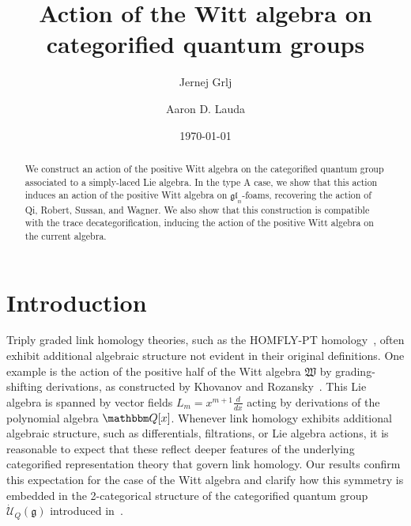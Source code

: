 \documentclass{amsart}
\numberwithin{equation}{section}
\theoremstyle{definition}
\def\Q{{\mathbbm Q}}
\newcommand{\witt}{{\mathfrak{W}}}
\begin{document}
 

\title{Action of the Witt algebra on categorified quantum groups}
 
\author[J. Grlj]{Jernej Grlj}
\address{Department of Mathematics\\
 University of Southern California \\
  Los Angeles, California 90089, USA}
%
\author[A.D. Lauda]{Aaron D. Lauda}
\address{Department of Mathematics\\
 University of Southern California \\
  Los Angeles, California 90089, USA}
\date{\today}

 

\maketitle

\begin{abstract}
We construct an action of the positive Witt algebra on the categorified quantum group associated to a simply-laced Lie algebra.  In the type A case, we show that this action induces an action of the positive Witt algebra on $\mathfrak{gl}_n$-foams, recovering the action of Qi, Robert, Sussan, and Wagner.    We also show that this construction is compatible with the trace decategorification, inducing the action of the positive Witt algebra on the current algebra.   
\end{abstract}

\section{Introduction}

Triply graded link homology theories, such as the HOMFLY-PT homology~\cite{Khovanov_2008}, often exhibit additional algebraic structure not evident in their original definitions.   One example is the action of the positive half of the Witt algebra $\witt$ by grading-shifting derivations, as constructed by Khovanov and Rozansky~\cite{khovanov2013positivehalfwittalgebra}.  This Lie algebra is spanned by vector fields $L_m = x^{m+1}\frac{d}{dx}$ acting by derivations of the polynomial algebra $\Q[x]$.   
%
Whenever link homology exhibits additional algebraic structure, such as differentials, filtrations, or Lie algebra actions, it is reasonable to expect that these reflect deeper features of the underlying categorified representation theory that govern link homology. Our results confirm this expectation for the case of the Witt algebra and clarify how this symmetry is embedded in the 2-categorical structure of the categorified quantum group $\dot{\mathcal{U}}_Q(\mathfrak{g})$ introduced in~\cite{Lau1,KL3,Rou2}.
 
\end{document}
